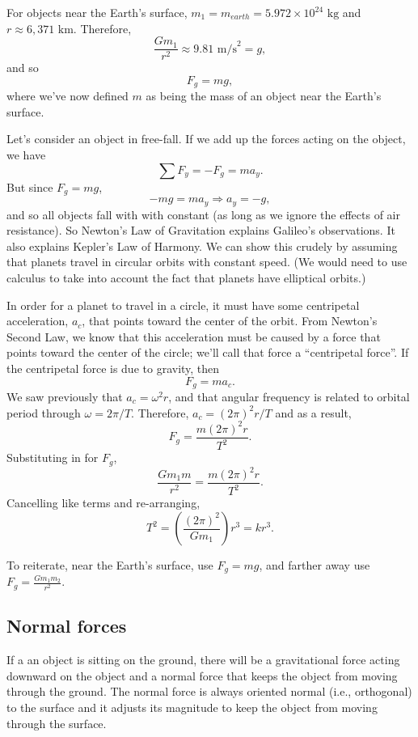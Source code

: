For objects near the Earth's surface, $m_1=m_{earth}=5.972\times 10^{24}\mbox{ kg}$ and $r\approx 6,371\mbox{ km}$. Therefore,
$$\frac{Gm_1}{r^2}\approx 9.81\mbox{ m/s}^2=g,$$
and so
$$F_g=mg,$$
where we've now defined $m$ as being the mass of an object near the Earth's surface.

Let's consider an object in free-fall. If we add up the forces acting on the object, we have
$$\sum F_y=-F_g=ma_y.$$
But since $F_g=mg$,
$$-mg=ma_y\Rightarrow \boxed{a_y=-g},$$
and so all objects fall with with constant (as long as we ignore the effects of air resistance). So Newton's Law of Gravitation explains Galileo's observations. It also explains Kepler's Law of Harmony. We can show this crudely by assuming that planets travel in circular orbits with constant speed. (We would need to use calculus to take into account the fact that planets have elliptical orbits.)

In order for a planet to travel in a circle, it must have some centripetal acceleration, $a_c$, that points toward the center of the orbit. From Newton's Second Law, we know that this acceleration must be caused by a force that points toward the center of the circle; we'll call that force a ``centripetal force''. If the centripetal force is due to gravity, then
$$F_g=ma_c.$$
We saw previously that $a_c=\omega^2 r$, and that angular frequency is related to orbital period through $\omega=2\pi/T$. Therefore, $a_c=(2\pi)^2r/T$ and as a result,
$$F_g=\frac{m(2\pi)^2r}{T^2}.$$
Substituting in for $F_g$,
$$\frac{Gm_1m}{r^2}=\frac{m(2\pi)^2r}{T^2}.$$
Cancelling like terms and re-arranging,
$$\boxed{T^2=\left(\frac{(2\pi)^2}{Gm_1}\right)r^3=kr^3}.$$

To reiterate, near the Earth's surface, use $F_g=mg$, and farther away use $F_g=\frac{Gm_1m_2}{r^2}$.

\subsection{Normal forces}
If a an object is sitting on the ground, there will be a gravitational force acting downward on the object and a normal force that keeps the object from moving through the ground. The normal force is always oriented normal (i.e., orthogonal) to the surface and it adjusts its magnitude to keep the object from moving through the surface.

\vspace{3cm}

